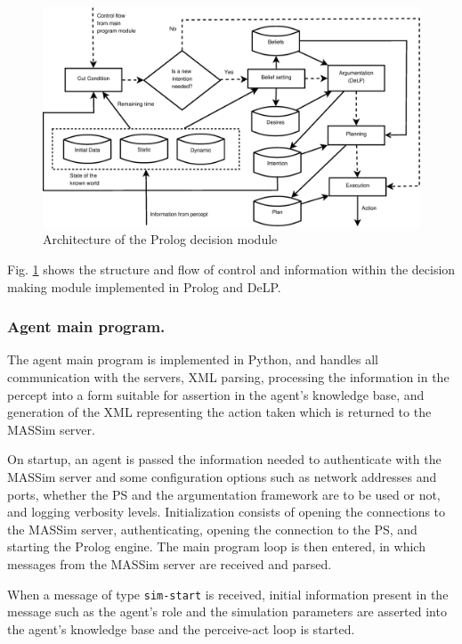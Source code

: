    \begin{figure}[!htb]
    \centering
    \includegraphics[width=\textwidth]{agentprolog.eps}
    \caption{Architecture of the Prolog decision module}
    \label{fig:prologmodule}
    \end{figure}

    Fig. \ref{fig:prologmodule} shows the structure and flow of control and
    information within the decision making module implemented in Prolog and
    DeLP.
    
\subsubsection{Agent main program.}
    The agent main program is implemented in Python, and handles all
    communication with the servers, XML parsing, processing the information in
    the percept into a form suitable for assertion in the agent's knowledge
    base, and generation of the XML representing the action taken which is
    returned to the MASSim server.

    On startup, an agent is passed the information needed to authenticate with
    the MASSim server and some configuration options such as network addresses
    and ports, whether the PS and the argumentation framework are to
    be used or not, and logging verbosity levels.
    Initialization consists of opening the connections to the MASSim server,
    authenticating, opening the connection to the PS, and starting
    the Prolog engine. The main program loop is then entered, in which messages
    from the MASSim server are received and parsed. 

    When a message of type \texttt{sim-start} is received, initial information
    present in the message such as the agent's role and the simulation
    parameters are asserted into the agent's knowledge base and the perceive-act
    loop is started.

